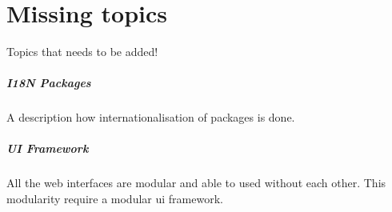 \label{sec:missing topics} 
\chapter{Missing topics}

Topics that needs to be added!

\paragraph{I18N Packages}
A description how internationalisation of packages is done.

\paragraph{UI Framework}
All the web interfaces are modular and able to used without each other. This modularity require a modular ui framework.
